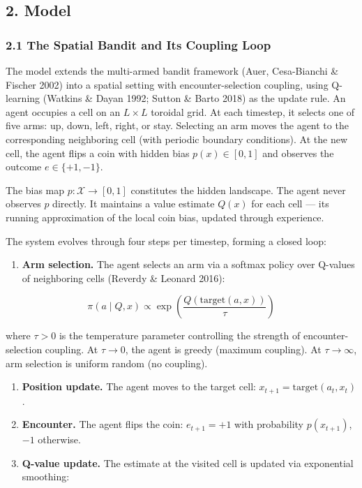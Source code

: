 \documentclass[
]{article}
\providecommand{\tightlist}{%
  \setlength{\itemsep}{0pt}\setlength{\parskip}{0pt}}
\begin{document}
\subsection{2. Model}\label{model}

\subsubsection{2.1 The Spatial Bandit and Its Coupling
Loop}\label{the-spatial-bandit-and-its-coupling-loop}

The model extends the multi-armed bandit framework (Auer, Cesa-Bianchi
\& Fischer 2002) into a spatial setting with encounter-selection
coupling, using Q-learning (Watkins \& Dayan 1992; Sutton \& Barto 2018)
as the update rule. An agent occupies a cell on an \(L \times L\)
toroidal grid. At each timestep, it selects one of five arms: up, down,
left, right, or stay. Selecting an arm moves the agent to the
corresponding neighboring cell (with periodic boundary conditions). At
the new cell, the agent flips a coin with hidden bias
\(p(x) \in [0, 1]\) and observes the outcome \(e \in \{+1, -1\}\).

The bias map \(p: \mathcal{X} \to [0, 1]\) constitutes the hidden
landscape. The agent never observes \(p\) directly. It maintains a value
estimate \(Q(x)\) for each cell --- its running approximation of the
local coin bias, updated through experience.

The system evolves through four steps per timestep, forming a closed
loop:

\begin{enumerate}
\def\labelenumi{\arabic{enumi}.}
\tightlist
\item
  \textbf{Arm selection.} The agent selects an arm via a softmax policy
  over Q-values of neighboring cells (Reverdy \& Leonard 2016):
\end{enumerate}

\[\pi(a \mid Q, x) \propto \exp\!\left(\frac{Q(\mathrm{target}(a, x))}{\tau}\right)\]

where \(\tau > 0\) is the temperature parameter controlling the strength
of encounter-selection coupling. At \(\tau \to 0\), the agent is greedy
(maximum coupling). At \(\tau \to \infty\), arm selection is uniform
random (no coupling).

\begin{enumerate}
\def\labelenumi{\arabic{enumi}.}
\setcounter{enumi}{1}
\item
  \textbf{Position update.} The agent moves to the target cell:
  \(x_{t+1} = \mathrm{target}(a_t, x_t)\).
\item
  \textbf{Encounter.} The agent flips the coin: \(e_{t+1} = +1\) with
  probability \(p(x_{t+1})\), \(-1\) otherwise.
\item
  \textbf{Q-value update.} The estimate at the visited cell is updated
  via exponential smoothing:
\end{enumerate}
\end{document}
